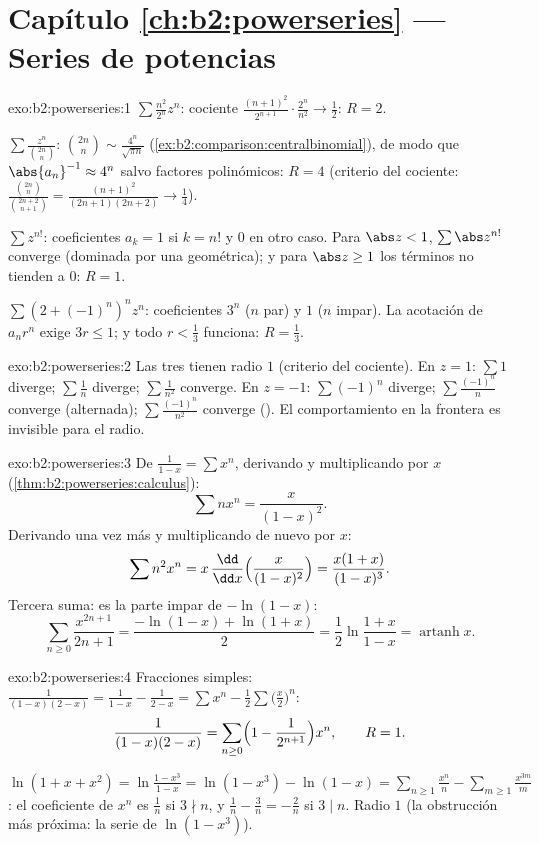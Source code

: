 \section*{Capítulo \ref{ch:b2:powerseries} --- Series de potencias}

\begin{solution}{exo:b2:powerseries:1}
$\sum \frac{n^2}{2^n}z^n$: cociente $\frac{(n+1)^2}{2^{n+1}}\cdot
\frac{2^n}{n^2} \to \frac12$: $R = 2$.

$\sum \frac{z^n}{\binom{2n}{n}}$: $\binom{2n}{n} \sim
\frac{4^n}{\sqrt{\pi n}}$
(\cref{ex:b2:comparison:centralbinomial}), de modo que
$\abs{a_n}^{-1} \approx 4^n$ salvo factores polinómicos: $R = 4$
(criterio del cociente: $\frac{\binom{2n}{n}}{\binom{2n+2}{n+1}} =
\frac{(n+1)^2}{(2n+1)(2n+2)} \to \frac14$).

$\sum z^{n!}$: coeficientes $a_k = 1$ si $k = n!$ y $0$ en otro
caso. Para $\abs z < 1$, $\sum \abs z^{n!}$ converge (dominada por
una geométrica); y para $\abs z \geq 1$ los términos no tienden a
$0$: $R = 1$.

$\sum (2 + (-1)^n)^n z^n$: coeficientes $3^n$ ($n$ par) y $1$ ($n$
impar). La acotación de $a_nr^n$ exige $3r \leq 1$; y todo $r <
\frac13$ funciona: $R = \frac13$.
\end{solution}

\begin{solution}{exo:b2:powerseries:2}
Las tres tienen radio $1$ (criterio del cociente). En $z = 1$: $\sum
1$ diverge; $\sum\frac1n$ diverge; $\sum\frac{1}{n^2}$ converge. En
$z = -1$: $\sum(-1)^n$ diverge; $\sum\frac{(-1)^n}{n}$ converge
(alternada); $\sum\frac{(-1)^n}{n^2}$ converge (). El
comportamiento en la frontera es invisible para el radio.
\end{solution}

\begin{solution}{exo:b2:powerseries:3}
De $\frac{1}{1-x} = \sum x^n$, derivando y multiplicando por $x$
(\cref{thm:b2:powerseries:calculus}):
\[
\sum n x^n = \frac{x}{(1-x)^2} .
\]
Derivando una vez más y multiplicando de nuevo por $x$:
\[
\sum n^2 x^n = x\,\frac{\dd}{\dd x}\Bigl(\frac{x}{(1-x)^2}\Bigr)
= \frac{x(1 + x)}{(1-x)^3} .
\]
Tercera suma: es la parte impar de $-\ln(1 - x)$:
\[
\sum_{n\geq0} \frac{x^{2n+1}}{2n+1}
= \frac{-\ln(1-x) + \ln(1+x)}{2}
= \frac12 \ln\frac{1+x}{1-x}
= \operatorname{artanh} x .
\]
\end{solution}

\begin{solution}{exo:b2:powerseries:4}
Fracciones simples: $\frac{1}{(1-x)(2-x)} = \frac{1}{1-x} -
\frac{1}{2 - x} = \sum x^n - \frac12\sum \bigl(\frac x2\bigr)^n$:
\[
\frac{1}{(1-x)(2-x)} = \sum_{n\geq0} \Bigl(1 -
\frac{1}{2^{n+1}}\Bigr)x^n,
\qquad R = 1 .
\]

$\ln(1 + x + x^2) = \ln\frac{1 - x^3}{1 - x} = \ln(1 - x^3) - \ln(1
- x) = \sum_{n\geq1}\frac{x^n}{n} -
\sum_{m\geq1}\frac{x^{3m}}{m}$: el coeficiente de $x^n$ es
$\frac1n$ si $3 \nmid n$, y $\frac1n - \frac{3}{n} = -\frac2n$ si $3
\mid n$. Radio $1$ (la obstrucción más próxima: la serie de $\ln(1 -
x^3)$).
\end{solution}

